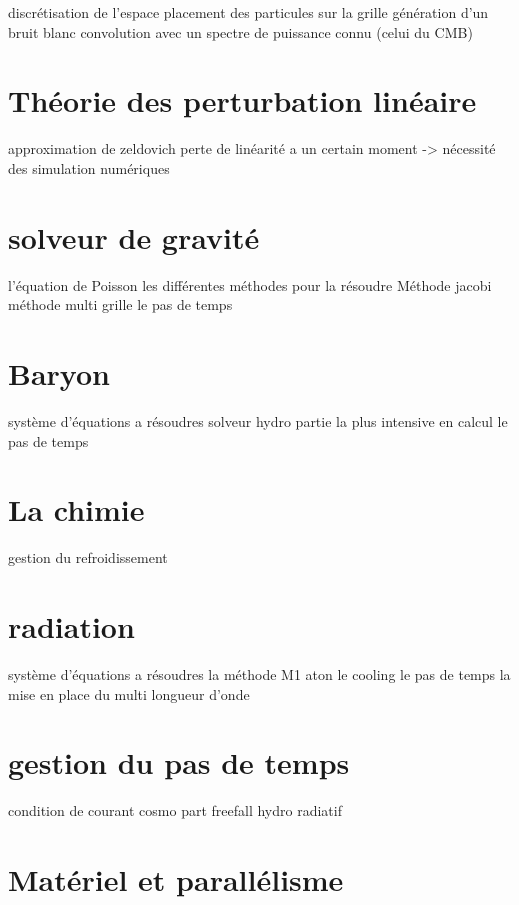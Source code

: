     discrétisation de l'espace
    placement des particules sur la grille
    génération d'un bruit blanc
    convolution avec un spectre de puissance connu (celui du CMB)


\section{Théorie des perturbation linéaire}

approximation de zeldovich
perte de linéarité a un certain moment -> nécessité des simulation numériques





\section{solveur de gravité}

l'équation de Poisson
les différentes méthodes pour la résoudre
Méthode jacobi
méthode multi grille
le pas de temps

\section{Baryon}

système d'équations a résoudres
solveur hydro
partie la plus intensive en calcul
le pas de temps

\section{La chimie}

gestion du refroidissement

\section{radiation}

système d'équations a résoudres
la méthode M1
aton
le cooling
le pas de temps
la mise en place du multi longueur d'onde

\section{gestion du pas de temps}

condition de courant
cosmo
part
freefall
hydro
radiatif

\section{Matériel et parallélisme}

